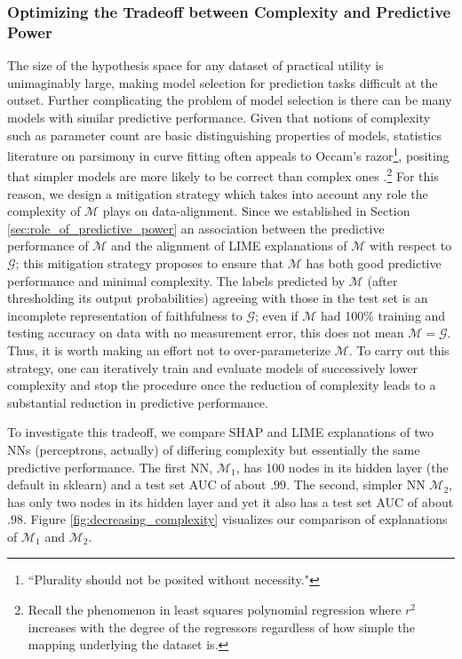 \documentclass[mnsc,blindrev]{informs3}
\newcommand{\tw}[1]{\textcolor{red}{Tong: #1}}
\begin{document}
        \subsubsection{Optimizing the Tradeoff between Complexity and Predictive Power}
            \label{sec:decreasing_complexity}
            The size of the hypothesis space for any dataset of practical utility is unimaginably large, making model selection for prediction tasks difficult at the outset. Further complicating the problem of model selection is there can be many models with similar predictive performance. Given that notions of complexity such as parameter count are basic distinguishing properties of models, statistics literature on parsimony in curve fitting often appeals to Occam's razor\footnote{``Plurality should not be posited without necessity."}, positing that simpler models are more likely to be correct than complex ones \citep{popper2005logic}.\footnote{Recall the phenomenon in least squares polynomial regression where $r^2$ increases with the degree of the regressors regardless of how simple the mapping underlying the dataset is.}
            For this reason, we design a mitigation strategy which takes into account any role the complexity of $\mathcal{M}$ plays on data-alignment. Since we established in Section \ref{sec:role_of_predictive_power} an association between the predictive performance of $\mathcal{M}$ and the alignment of LIME explanations of $\mathcal{M}$ with respect to $\mathcal{G}$; this mitigation strategy proposes to ensure that $\mathcal{M}$ has both good predictive performance and minimal complexity. The labels predicted by $\mathcal{M}$ (after thresholding its output probabilities) agreeing with those in the test set is an incomplete representation of faithfulness to $\mathcal{G}$; even if $\mathcal{M}$ had 100\% training and testing accuracy on data with no measurement error, this does not mean $\mathcal{M}=\mathcal{G}$.  Thus, it is worth making an effort not to over-parameterize $\mathcal{M}$.%
            To carry out this strategy, one can iteratively train and evaluate models of successively lower complexity and stop the procedure once the reduction of complexity leads to a substantial reduction in predictive performance. 
            
            To investigate this tradeoff, we compare SHAP and LIME explanations of two NNs (perceptrons, actually) of differing complexity but essentially the same predictive performance. The first NN, $\mathcal{M}_1$, has 100 nodes in its hidden layer (the default in sklearn) and a test set AUC of about $.99$. The second, simpler NN $\mathcal{M}_2$, has only two nodes in its hidden layer and yet it also has a test set AUC of about $.98$. Figure \ref{fig:decreasing_complexity} visualizes our comparison of explanations of $\mathcal{M}_1$ and $\mathcal{M}_2$. %
\end{document}
